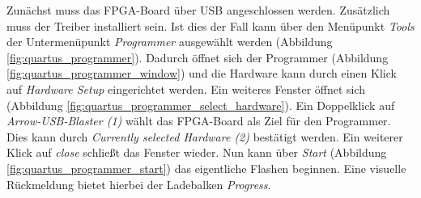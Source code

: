     Zunächst muss das FPGA-Board über USB angeschlossen werden. Zusätzlich muss der Treiber installiert sein.
    Ist dies der Fall kann über den Menüpunkt \textit{Tools} der Untermenüpunkt \textit{Programmer}
    ausgewählt werden (Abbildung \ref{fig:quartus_programmer}).
    Dadurch öffnet sich der Programmer (Abbildung \ref{fig:quartus_programmer_window})
    und die Hardware kann durch einen Klick auf \textit{Hardware Setup} eingerichtet werden.
    Ein weiteres Fenster öffnet sich (Abbildung \ref{fig:quartus_programmer_select_hardware}).
    Ein Doppelklick auf \textit{Arrow-USB-Blaster (1)} wählt das FPGA-Board als Ziel für den Programmer.
    Dies kann durch \textit{Currently selected Hardware (2)} bestätigt werden. Ein weiterer Klick auf
    \textit{close} schließt das Fenster wieder. Nun kann über \textit{Start}
    (Abbildung \ref{fig:quartus_programmer_start}) das eigentliche Flashen beginnen.
    Eine visuelle Rückmeldung bietet hierbei der Ladebalken \textit{Progress}.
    

